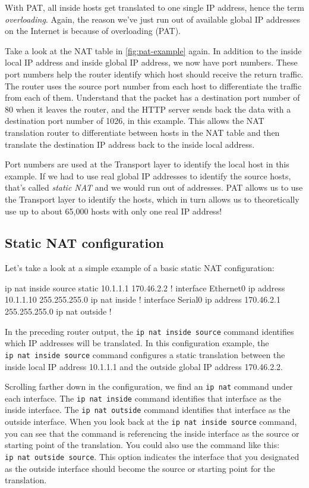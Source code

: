 With PAT, all inside hosts get translated to one single IP address,
hence the term \emph{overloading}.
Again, the reason we've just run out of available global IP addresses on the Internet is because of overloading (PAT).

Take a look at the NAT table in \cref{fig:pat-example} again.
In addition to the inside local IP address and inside global IP address, we
now have port numbers. These port numbers help the router identify which
host should receive the return traffic. The router uses the source port
number from each host to differentiate the traffic from each of them.
Understand that the packet has a destination port number of 80 when it
leaves the router, and the HTTP server sends back the data with a
destination port number of 1026, in this example. This allows the NAT
translation router to differentiate between hosts in the NAT table and
then translate the destination IP address back to the inside local
address.

Port numbers are used at the Transport layer to identify the local host
in this example. If we had to use real global IP addresses to identify
the source hosts, that's called \emph{static NAT}
and we would run out of addresses. PAT allows us to use the Transport layer to identify the
hosts, which in turn allows us to theoretically use up to about 65,000
hosts with only one real IP address!



\subsection{Static NAT configuration}

Let's take a look at a simple example of a basic static NAT configuration:

\begin{cli}
ip nat inside source static 10.1.1.1 170.46.2.2
!
interface Ethernet0
 ip address 10.1.1.10 255.255.255.0
 ip nat inside
!
interface Serial0
 ip address 170.46.2.1 255.255.255.0
 ip nat outside
!
\end{cli}

In the preceding router output, the \texttt{ip\ nat\ inside\ source}
command identifies which IP addresses will be translated. In this
configuration example, the \texttt{ip\ nat\ inside\ source} command
configures a static translation between the inside local IP address
10.1.1.1 and the outside global IP address 170.46.2.2.

Scrolling farther down in the configuration, we find an \texttt{ip\ nat}
command under each interface. The \texttt{ip\ nat\ inside} command
identifies that interface as the inside interface. The
\texttt{ip\ nat\ outside} command identifies that interface as the
outside interface. When you look back at the
\texttt{ip\ nat\ inside\ source} command, you can see that the command
is referencing the inside interface as the source or starting point of
the translation. You could also use the command like this:
\texttt{ip\ nat\ outside\ source}. This option indicates the interface
that you designated as the outside interface should become the source or
starting point for the translation.






